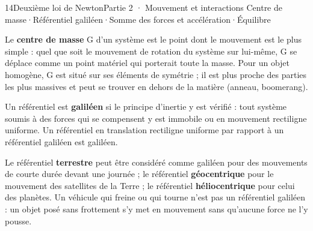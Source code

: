 \begin{ouverture}[newton]{14}{Deuxième loi de Newton}{Partie 2 · Mouvement et interactions}
{Centre de masse\enspace·\enspace Référentiel galiléen\enspace·\enspace Somme des forces et accélération\enspace·\enspace Équilibre}
\end{ouverture}
\essentiel
{}
\begin{definition}
Le \textbf{centre de masse} G d'un système est le point dont le mouvement est le plus simple : quel que soit le
mouvement de rotation du système sur lui-même, G se déplace comme un point matériel qui porterait toute la masse.
Pour un objet homogène, G est situé sur ses éléments de symétrie ; il est plus proche des parties les plus massives et
peut se trouver en dehors de la matière (anneau, boomerang).
\end{definition}
\begin{definition}
Un référentiel est \textbf{galiléen} si le principe d'inertie y est vérifié : tout système soumis à des forces qui se
compensent y est immobile ou en mouvement rectiligne uniforme. Un référentiel en translation rectiligne uniforme par
rapport à un référentiel galiléen est galiléen.
\end{definition}
\begin{propriete}
Le référentiel \textbf{terrestre} peut être considéré comme galiléen pour des mouvements de courte durée devant une
journée ; le référentiel \textbf{géocentrique} pour le mouvement des satellites de la Terre ; le référentiel
\textbf{héliocentrique} pour celui des planètes. Un véhicule qui freine ou qui tourne n'est pas un référentiel
galiléen : un objet posé sans frottement s'y met en mouvement sans qu'aucune force ne l'y pousse.
\end{propriete}
